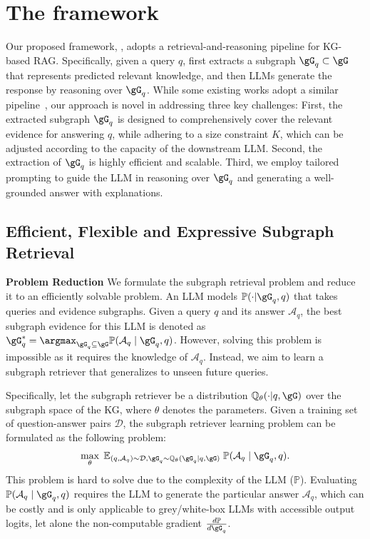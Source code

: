 \section{The \proj framework}

Our proposed framework, \proj, adopts a retrieval-and-reasoning pipeline for KG-based RAG. Specifically, given a query $q$, \proj first extracts a subgraph $\gG_q\subset \gG$ that represents predicted relevant knowledge, and then LLMs generate the response by reasoning over $\gG_q$. While some existing works adopt a similar pipeline~\citep{zhang2022subgraph, luo2024rog, wu2023retrieve, wen2023mindmap}, our approach is novel in addressing three key challenges: First, the extracted subgraph $\gG_q$ is designed to comprehensively cover the relevant evidence for answering $q$, while adhering to a size constraint $K$, which can be adjusted according to the capacity of the downstream LLM. Second, the extraction of $\gG_q$ is highly efficient and scalable. Third, we employ tailored prompting to guide the LLM in reasoning over $\gG_q$ and generating a well-grounded answer with explanations.

\subsection{Efficient, Flexible and Expressive Subgraph Retrieval}
\label{sec:retriever}

\textbf{Problem Reduction} We formulate the subgraph retrieval problem and reduce it to an efficiently solvable problem. An LLM models $\mathbb{P}(\cdot | \gG_q, q)$ that takes queries and evidence subgraphs. Given a query $q$ and its answer $\mathcal{A}_{q}$, the best subgraph evidence for this LLM is denoted as $\gG_q^* = \argmax_{\gG_q\subseteq \gG} \mathbb{P}(\mathcal{A}_{q}\mid \gG_q, q)$. However, solving this problem is impossible as it requires the knowledge of $\mathcal{A}_{q}$. Instead, we aim to learn a subgraph retriever that generalizes to unseen future queries. 

Specifically, let the subgraph retriever be a distribution $\mathbb{Q}_{\theta}(\cdot | q, \gG)$ over the subgraph space of the KG, where $\theta$ denotes the parameters. Given a training set of question-answer pairs $\mathcal{D}$, the subgraph retriever learning problem can be formulated as the following problem: 
\begin{align} \label{eq:subgraph-retrieval}
    \max_{\theta } \; \mathbb{E}_{(q, \mathcal{A}_{q})\sim \mathcal{D}, \gG_q\sim \mathbb{Q}_{\theta}(\gG_q \mid q, \gG)}\;\mathbb{P}(\mathcal{A}_{q}\mid \gG_q, q).
\end{align}
This problem is hard to solve due to the complexity of the LLM ($\mathbb{P}$). Evaluating $\mathbb{P}(\mathcal{A}_{q}\mid \gG_q, q)$ requires the LLM to generate the particular answer $\mathcal{A}_{q}$, which can be costly and is only applicable to grey/white-box LLMs with accessible output logits, let alone the non-computable gradient $\frac{d\mathbb{P}}{d \gG_q}$.

